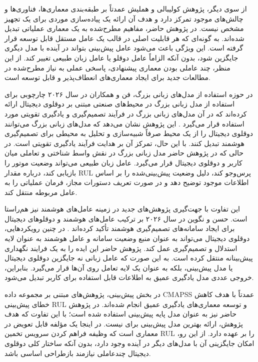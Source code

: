 \documentclass[a4paper,fleqn]{report}
\begin{document}
از سوی دیگر، پژوهش کولیبالی و هملیش عمدتاً بر طبقه‌بندی معماری‌ها،
فناوری‌ها و چالش‌های موجود تمرکز دارد و هدف آن ارائه یک پیاده‌سازی
موردی برای یک تجهیز مشخص نیست. در پژوهش حاضر، مفاهیم مطرح‌شده به یک معماری عملیاتی تبدیل شده‌اند. به گونه‌ای که هر قابلیت
اصلی در قالب یک عامل مستقل قابل توسعه قرار گرفته است. این ویژگی باعث
می‌شود عامل پیش‌بینی بتواند در آینده با مدل دیگری جایگزین شود، بدون
آنکه الزاماً عامل دوقلو یا عامل زبان طبیعی تغییر کند. از این منظر،
چند عاملی بودن معماری پیشنهادی، پاسخی عملی به نیاز مطرح‌شده در مطالعات
جدید برای ایجاد معماری‌های انعطاف‌پذیر و قابل توسعه است.

در حوزه استفاده از مدل‌های زبانی بزرگ،
 فن و همکاران در سال ۲۰۲۶
چارچوبی برای استفاده از مدل زبانی بزرگ در محیط‌های صنعتی مبتنی بر
دوقلوی دیجیتال ارائه کرده‌اند که در آن مدل‌های زبانی بزرگ در فرآیند تصمیم‌گیری و
یادگیری تقویتی مورد استفاده قرار می‌گیرد \cite{fan2026llmrl}. این
پژوهش نشان می‌دهد که مدل‌های زبانی بزرگ می‌توانند دوقلوی دیجیتال را از یک محیط
صرفاً شبیه‌سازی و تحلیل به محیطی برای تصمیم‌گیری هوشمند تبدیل کنند.
با این حال، تمرکز آن بر هدایت فرآیند یادگیری تقویتی است. در حالی که
در پژوهش حاضر مدل زبانی بزرگ در نقش واسط شناختی و تعاملی میان کاربر و دوقلوی
دیجیتال قرار می‌گیرد. عامل زبان طبیعی می‌تواند وضعیت موتور را
بازیابی کند، درباره مقدار \gls{RUL} پرس‌وجو کند، دلیل وضعیت پیش‌بینی‌شده را
بر اساس اطلاعات موجود توضیح دهد و در صورت تعریف دستورات مجاز، فرمان
عملیاتی را به عامل مربوطه منتقل کند.

این تفاوت با جهت‌گیری پژوهش‌های جدید در زمینه عامل‌های هوشمند نیز
هم‌راستا است.
 حسن
 و 
 نگوین
 در سال ۲۰۲۶ بر ترکیب عامل‌های هوشمند و
دوقلوهای دیجیتال برای ایجاد سامانه‌های تصمیم‌گیری هوشمند تأکید
کرده‌اند \cite{hasan2026agenticdt}. در چنین رویکردهایی، دوقلوی دیجیتال
می‌تواند به عنوان منبع وضعیت سامانه و عامل هوشمند به عنوان لایه
استدلال و تصمیم‌گیری عمل کند. پژوهش حاضر این ایده را به یک فرایند
نگهداری پیش‌بینانه منتقل کرده است. به این صورت که عامل زبانی نه
جایگزین دوقلوی دیجیتال یا مدل پیش‌بینی، بلکه به عنوان یک لایه تعامل
روی آن‌ها قرار می‌گیرد. بنابراین، خروجی عددی مدل یادگیری عمیق به
اطلاعات قابل استفاده برای کاربر تبدیل می‌شود.

در بخش پیش‌بینی، پژوهش‌های مبتنی بر مجموعه داده \gls{CMAPSS} عمدتاً
با هدف کاهش خطای پیش‌بینی \gls{RUL} و توسعه معماری‌های یادگیری عمیق انجام
شده‌اند. در پژوهش حاضر نیز  به عنوان مدل پایه پیش‌بینی استفاده
شده است؛ با این تفاوت که هدف پژوهش، ارائه بهترین مدل پیش‌بینی برای
 نیست. 
در اینجا یک مؤلفه قابل تعویض در معماری است که وظیفه
فراهم کردن سرویس تخمین \gls{RUL} را بر عهده دارد. از این رو، امکان جایگزینی
آن با مدل‌های دیگر در آینده وجود دارد، بدون آنکه ساختار کلی دوقلوی
دیجیتال چندعاملی نیازمند بازطراحی اساسی باشد.
\end{document}
